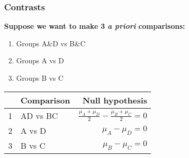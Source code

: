\documentclass[color=usenames,dvipsnames]{beamer}\usepackage[]{graphicx}\usepackage[]{color}
\begin{document}
\begin{frame}[fragile]
  \frametitle{Contrasts}
  {\bf Suppose we want to make 3 {\it a priori} comparisons:}
  \begin{enumerate}[\bf (1)]
    \item Groups A\&D vs B\&C
    \item Groups A vs D
    \item Groups B vs C
  \end{enumerate}
  \pause
  \vspace{0.5cm}
  \begin{center}
    \begin{tabular}{llr}
      \hline
        & Comparison & Null hypothesis \\
      \hline
      1 & AD vs BC & $\frac{\mu_A + \mu_D}{2} - \frac{\mu_B + \mu_C}{2} = 0$ \\
      2 & A vs D & $\mu_A - \mu_D = 0$ \\
      3 & B vs C & $\mu_B - \mu_C = 0$ \\
      \hline
    \end{tabular}
  \end{center}
\end{frame}
\end{document}
